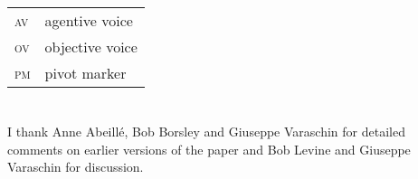 \documentclass[output=paper,biblatex,babelshorthands,newtxmath,draftmode,colorlinks,citecolor=brown]{langscibook}
\begin{document}
\begin{tabularx}{.99\textwidth}{@{}lX}
\textsc{av} & agentive voice\\
\textsc{ov} & objective voice\\
\textsc{pm} & pivot marker\\
\end{tabularx}




\section*{\acknowledgmentsUS}


I thank Anne Abeillé, Bob Borsley and Giuseppe Varaschin for detailed comments on earlier versions
of the paper and Bob Levine and Giuseppe Varaschin for discussion.








{\sloppy
\printbibliography[heading=subbibliography,notkeyword=this]
}
\end{document}
